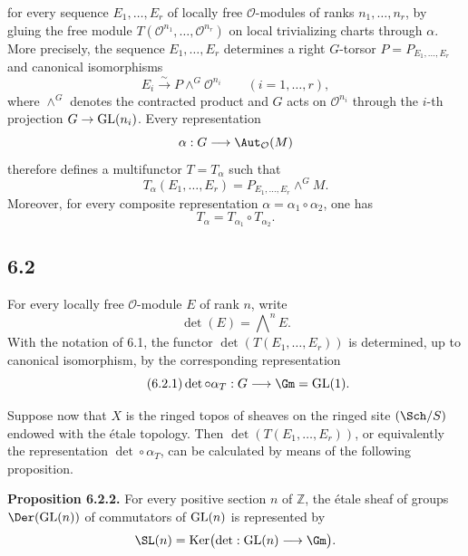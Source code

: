 for every sequence $E_1,\ldots,E_r$ of locally free $\mathcal O$-modules of
ranks $n_1,\ldots,n_r$, by gluing the free module
$T(\mathcal O^{n_1},\ldots,\mathcal O^{n_r})$ on local trivializing charts
through $\alpha$. More precisely, the sequence $E_1,\ldots,E_r$ determines a
right $G$-torsor $P=P_{E_1,\ldots,E_r}$ and canonical isomorphisms
\begin{equation}\tag{6.1.3}
E_i\xrightarrow{\sim}P\mathbin{\wedge^G}\mathcal O^{n_i}
\qquad(i=1,\ldots,r),
\end{equation}
where $\wedge^G$ denotes the contracted product and $G$ acts on
$\mathcal O^{n_i}$ through the $i$-th projection $G\to\operatorname{GL}(n_i)$. Every
representation
\[
\alpha:G\longrightarrow\Aut_{\mathcal O}(M)
\]
therefore defines a multifunctor $T=T_\alpha$ such that
\begin{equation}\tag{6.1.4}
T_\alpha(E_1,\ldots,E_r)
=P_{E_1,\ldots,E_r}\mathbin{\wedge^G}M.
\end{equation}
Moreover, for every composite representation
$\alpha=\alpha_1\circ\alpha_2$, one has
\begin{equation}\tag{6.1.5}
T_\alpha=T_{\alpha_1}\circ T_{\alpha_2}.
\end{equation}

\subsection*{6.2}
For every locally free $\mathcal O$-module $E$ of rank $n$, write
\[
\det(E)=\bigwedge\nolimits^n E.
\]
With the notation of 6.1, the functor $\det(T(E_1,\ldots,E_r))$ is
determined, up to canonical isomorphism, by the corresponding representation
\begin{equation}\tag{6.2.1}
\det\circ\alpha_T:G\longrightarrow\Gm=\GL(1).
\end{equation}

Suppose now that $X$ is the ringed topos of sheaves on the ringed site
$(\Sch/S)$ endowed with the \'etale topology. Then
$\det(T(E_1,\ldots,E_r))$, or equivalently the representation
$\det\circ\alpha_T$, can be calculated by means of the following proposition.

\textbf{Proposition 6.2.2.}
For every positive section $n$ of $\mathbb Z$, the \'etale sheaf of groups
$\Der(\GL(n))$ of commutators of $\operatorname{GL}(n)$ is represented by
\[
\SL(n)=\Ker\bigl(\det:\GL(n)\longrightarrow\Gm\bigr).
\]

